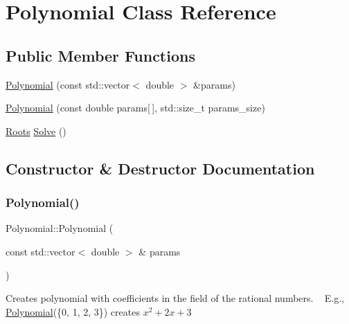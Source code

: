 \hypertarget{class_polynomial}{}\section{Polynomial Class Reference}
\label{class_polynomial}
\subsection*{Public Member Functions}
\begin{DoxyCompactItemize}
\item 
\mbox{\hyperlink{class_polynomial_a4884391c3366097d44556691daa3f942}{Polynomial}} (const std\+::vector$<$ double $>$ \&params)
\item 
\mbox{\hyperlink{class_polynomial_a0e0ad9a369edaaae98750da039cbde35}{Polynomial}} (const double params\mbox{[}$\,$\mbox{]}, std\+::size\+\_\+t params\+\_\+size)
\item 
\mbox{\hyperlink{struct_roots}{Roots}} \mbox{\hyperlink{class_polynomial_ac1a8732edb10e52f5ff4bba6aee83593}{Solve}} ()
\end{DoxyCompactItemize}


\subsection{Constructor \& Destructor Documentation}
\mbox{\label{class_polynomial_a4884391c3366097d44556691daa3f942}} 
\subsubsection{\texorpdfstring{Polynomial()}{Polynomial()}\hspace{0.1cm}{\footnotesize\ttfamily [1/2]}}
{\footnotesize\ttfamily Polynomial\+::\+Polynomial (\begin{DoxyParamCaption}\item[{const std\+::vector$<$ double $>$ \&}]{params }\end{DoxyParamCaption})\hspace{0.3cm}{\ttfamily [explicit]}}

Creates polynomial with coefficients in the field of the rational numbers. ~\newline
 E.\+g., \mbox{\hyperlink{class_polynomial}{Polynomial}}(\{0, 1, 2, 3\}) creates $ x^2 + 2x + 3 $


